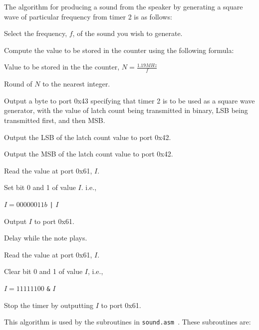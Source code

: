 The algorithm for producing a sound from the speaker by generating a square wave of particular frequency from timer 2 is as follows:
\begin{steps}[leftmargin=2cm]
  \item Select the frequency, $f$, of the sound you wish to generate. 
  \item Compute the value to be stored in the counter using the following formula:
  \begin{center}
  Value to be stored in the the counter, $N = \frac{1.19 MHz}{f}$
  \end{center}
  \item Round of $N$ to the nearest integer.
  \item Output a byte to port 0x43 specifying that timer 2 is to be used as a square wave generator, with the value of latch count being transmitted in binary, LSB being transmitted first, and then MSB.
  \item Output the LSB of the latch count value to port 0x42.
  \item Output the MSB of the latch count value to port 0x42.
  \item Read the value at port 0x61, $I$.
  \item Set bit 0 and 1 of value $I$. i.e., 
  \begin{center}
  $I = 00000011b$ \texttt{|} $I$
  \end{center} 
  \item Output $I$ to port 0x61.
  \item Delay while the note plays.
  \item Read the value at port 0x61, $I$.
  \item Clear bit 0 and 1 of value $I$, i.e.,
  \begin{center}
  $I = 11111100$ \texttt{\&} $I$
  \end{center}
  \item Stop the timer by outputting $I$ to port 0x61.
\end{steps}
This algorithm is used by the subroutines in \texttt{sound.asm }. These subroutines are:
